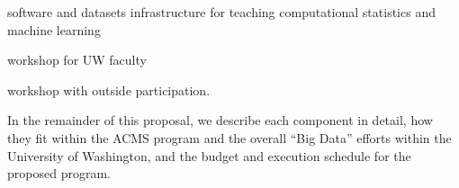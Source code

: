 \bits
  \item software and datasets infrastructure for teaching computational statistics and machine learning 
  \item workshop for UW faculty %
  \item workshop with outside participation. 
 \eits
\eits  

In the remainder of this proposal, we describe each component in
detail, how they fit within the ACMS program and the overall ``Big
Data'' efforts within the University of Washington, and the budget and
execution schedule for the proposed program.


